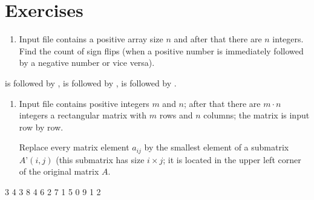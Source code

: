 \documentclass[letterpaper,10pt,english,openany,oneside]{sphinxmanual}
\begin{document}
\section{Exercises}
\label{\detokenize{constructs-week01:exercises}}\begin{enumerate}
%
\item {} 
\sphinxAtStartPar
Input file contains a positive array size \(n\) and after that there are \(n\)
integers. Find the count of sign flips (when a positive number
is immediately followed by a negative number or vice versa).

\end{enumerate}

\sphinxAtStartPar
{} 

\sphinxAtStartPar
{} 

\sphinxAtStartPar
{}  is followed by ,  is followed by ,  is followed by .
\begin{enumerate}
%
\setcounter{enumi}{1}
\item {} 
\sphinxAtStartPar
Input file contains positive integers \(m\) and \(n\); after that there are \(m \cdot n\)
integers \sphinxhyphen{} a rectangular matrix with \(m\) rows and \(n\) columns; the matrix is input row
by row.

\sphinxAtStartPar
Replace every matrix element \(a_{ij}\) by the smallest element of a submatrix
\(A’(i,j)\) (this submatrix has size \(i \times j\); it is located in the upper left corner
of the original matrix \(A\).

\end{enumerate}

\sphinxAtStartPar
{}

\begin{sphinxVerbatim}[commandchars=\\\{\}]
3 4
3 8 4 6
2 7 1 5
0 9 \PYGZhy{}1 2
\end{sphinxVerbatim}

\sphinxAtStartPar
{}
\end{document}
